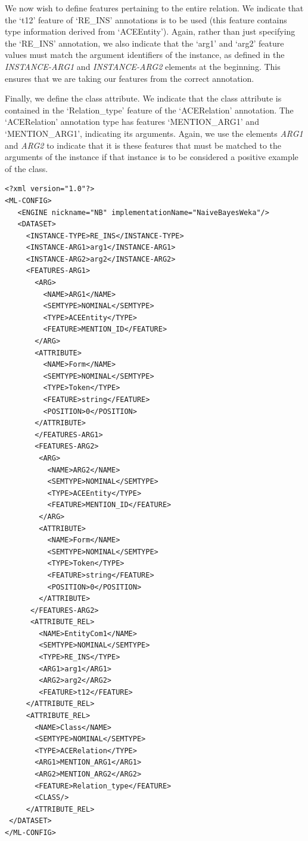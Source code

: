 We now wish to define features pertaining to the entire relation. We indicate
that the `t12' feature of `RE\_INS' annotations is to be used (this feature
contains type information derived from `ACEEntity'). Again, rather than just
specifying the `RE\_INS' annotation, we also indicate that the `arg1' and
`arg2' feature values must match the argument identifiers of the instance, as
defined in the {\em INSTANCE-ARG1} and {\em INSTANCE-ARG2} elements at the
beginning. This ensures that we are taking our features from the correct
annotation.

Finally, we define the class attribute. We indicate that the class attribute is
contained in the `Relation\_type' feature of the `ACERelation' annotation.
The `ACERelation' annotation type has features `MENTION\_ARG1' and
`MENTION\_ARG1', indicating its arguments. Again, we use the elements {\em
ARG1} and {\em ARG2} to indicate that it is these features that must be matched to the
arguments of the instance if that instance is to be considered a positive example
of the class.

\vspace{0.2cm}
\begin{small}\begin{verbatim}
<?xml version="1.0"?>
<ML-CONFIG>
   <ENGINE nickname="NB" implementationName="NaiveBayesWeka"/>
   <DATASET>
     <INSTANCE-TYPE>RE_INS</INSTANCE-TYPE>
     <INSTANCE-ARG1>arg1</INSTANCE-ARG1>
     <INSTANCE-ARG2>arg2</INSTANCE-ARG2>
     <FEATURES-ARG1>
       <ARG>
         <NAME>ARG1</NAME>
         <SEMTYPE>NOMINAL</SEMTYPE>
         <TYPE>ACEEntity</TYPE>
         <FEATURE>MENTION_ID</FEATURE>
       </ARG>
       <ATTRIBUTE>
         <NAME>Form</NAME>
         <SEMTYPE>NOMINAL</SEMTYPE>
         <TYPE>Token</TYPE>
         <FEATURE>string</FEATURE>
         <POSITION>0</POSITION>
       </ATTRIBUTE>
       </FEATURES-ARG1>
       <FEATURES-ARG2>
        <ARG>
          <NAME>ARG2</NAME>
          <SEMTYPE>NOMINAL</SEMTYPE>
          <TYPE>ACEEntity</TYPE>
          <FEATURE>MENTION_ID</FEATURE>
        </ARG>
        <ATTRIBUTE>
          <NAME>Form</NAME>
          <SEMTYPE>NOMINAL</SEMTYPE>
          <TYPE>Token</TYPE>
          <FEATURE>string</FEATURE>
          <POSITION>0</POSITION>
        </ATTRIBUTE>
      </FEATURES-ARG2>
      <ATTRIBUTE_REL>
        <NAME>EntityCom1</NAME>
        <SEMTYPE>NOMINAL</SEMTYPE>
        <TYPE>RE_INS</TYPE>
        <ARG1>arg1</ARG1>
        <ARG2>arg2</ARG2>
        <FEATURE>t12</FEATURE>
     </ATTRIBUTE_REL>
     <ATTRIBUTE_REL>
       <NAME>Class</NAME>
       <SEMTYPE>NOMINAL</SEMTYPE>
       <TYPE>ACERelation</TYPE>
       <ARG1>MENTION_ARG1</ARG1>
       <ARG2>MENTION_ARG2</ARG2>
       <FEATURE>Relation_type</FEATURE>
       <CLASS/>
     </ATTRIBUTE_REL>
 </DATASET>
</ML-CONFIG>
\end{verbatim}\end{small}

